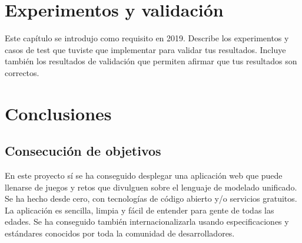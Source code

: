 \documentclass[a4paper, 12pt]{book}
\begin{document}

\cleardoublepage

\chapter{Experimentos y validación}

Este capítulo se introdujo como requisito en 2019. 
Describe los experimentos y casos de test que tuviste que implementar para validar tus resultados. 
Incluye también los resultados de validación que permiten afirmar que tus resultados son correctos. 




\cleardoublepage
\chapter{Conclusiones}
\label{chap:conclusiones}


\section{Consecución de objetivos}
\label{sec:consecucion-objetivos}

En este proyecto sí se ha conseguido desplegar una aplicación web que puede llenarse de juegos y retos que divulguen sobre el lenguaje de modelado unificado. Se ha hecho desde cero, con tecnologías de código abierto y/o servicios gratuitos. La aplicación es sencilla, limpia y fácil de entender para gente de todas las edades. Se ha conseguido también internacionalizarla usando especificaciones y estándares conocidos por toda la comunidad de desarrolladores.
\end{document}
